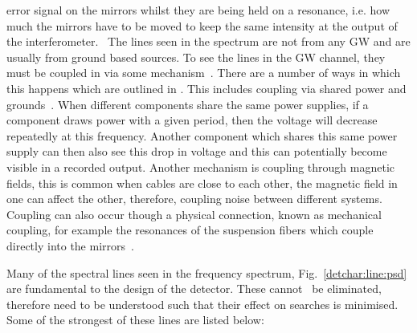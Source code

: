 error signal on the mirrors whilst they are being held on a resonance, i.e. how
much the mirrors have to be moved to keep the same intensity at the output of
the interferometer.~  The lines seen in the spectrum are not from any \gls{GW}
and are usually from ground based sources.  To see the lines in the \gls{GW}
channel, they must be coupled in via some mechanism~.  There are a number of
ways in which this happens which are outlined in
\citep{covas2018IdentificationMitigation}.  This includes coupling via shared
power and grounds~.  When different components share the same power supplies, if
a component draws power with a given period, then the voltage will decrease
repeatedly at this frequency.  Another component which shares this same power
supply can then also see this drop in voltage and this can potentially become
visible in a recorded output.  Another mechanism is coupling through magnetic
fields, this is common when cables are close to each other, the magnetic field
in one can affect the other, therefore, coupling noise between different
systems.  Coupling can also occur though a physical connection, known as
mechanical coupling, for example the resonances of the suspension fibers which
couple directly into the mirrors~.

%

Many of the spectral lines seen in the frequency spectrum,
Fig.~\ref{detchar:line:psd} are fundamental to the design of the detector.
These cannot~ be eliminated, therefore need to be understood such that their
effect on searches is minimised.  Some of the strongest of these lines are
listed below:

